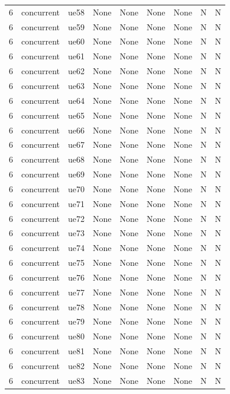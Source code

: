 \begin{table}[ht]
\begin{tabular}{|c|c|c|c|c|c|c|c|c|}
6 & concurrent & ue58 & None & None & None & None & N & N \\
6 & concurrent & ue59 & None & None & None & None & N & N \\
6 & concurrent & ue60 & None & None & None & None & N & N \\
6 & concurrent & ue61 & None & None & None & None & N & N \\
6 & concurrent & ue62 & None & None & None & None & N & N \\
6 & concurrent & ue63 & None & None & None & None & N & N \\
6 & concurrent & ue64 & None & None & None & None & N & N \\
6 & concurrent & ue65 & None & None & None & None & N & N \\
6 & concurrent & ue66 & None & None & None & None & N & N \\
6 & concurrent & ue67 & None & None & None & None & N & N \\
6 & concurrent & ue68 & None & None & None & None & N & N \\
6 & concurrent & ue69 & None & None & None & None & N & N \\
6 & concurrent & ue70 & None & None & None & None & N & N \\
6 & concurrent & ue71 & None & None & None & None & N & N \\
6 & concurrent & ue72 & None & None & None & None & N & N \\
6 & concurrent & ue73 & None & None & None & None & N & N \\
6 & concurrent & ue74 & None & None & None & None & N & N \\
6 & concurrent & ue75 & None & None & None & None & N & N \\
6 & concurrent & ue76 & None & None & None & None & N & N \\
6 & concurrent & ue77 & None & None & None & None & N & N \\
6 & concurrent & ue78 & None & None & None & None & N & N \\
6 & concurrent & ue79 & None & None & None & None & N & N \\
6 & concurrent & ue80 & None & None & None & None & N & N \\
6 & concurrent & ue81 & None & None & None & None & N & N \\
6 & concurrent & ue82 & None & None & None & None & N & N \\
6 & concurrent & ue83 & None & None & None & None & N & N \\

\end{tabular}
\end{table}
